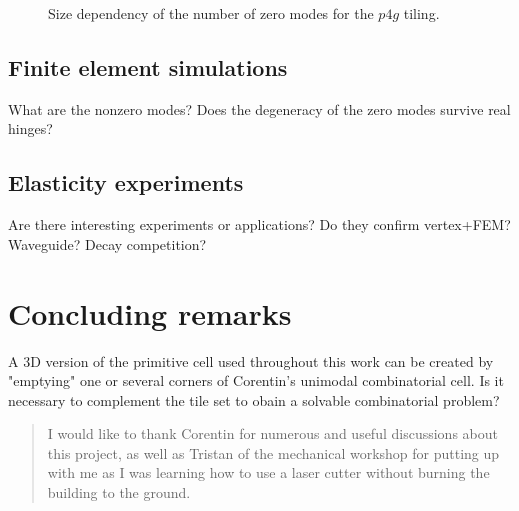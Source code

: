 	
		\begin{figure}[!ht]
				\caption{Size dependency of the number of zero modes for the $p4g$ tiling.}
				\label{fig:san:p4g}
			\end{figure}
			
		

\section{Finite element simulations}

	What are the nonzero modes? Does the degeneracy of the zero modes survive real hinges?

\section{Elasticity experiments}

	Are there interesting experiments or applications? Do they confirm vertex+FEM? Waveguide? Decay competition?
			
\chapter{Concluding remarks}

	A 3D version of the primitive cell used throughout this work can be created by "emptying" one or several corners of Corentin's unimodal combinatorial cell. Is it necessary to complement the tile set to obain a solvable combinatorial problem?
			
		
		
\renewcommand{\abstractname}{Acknowledgements}
\begin{abstract}
	I would like to thank Corentin for numerous and useful discussions about this project, as well as Tristan of the mechanical workshop for putting up with me as I was learning how to use a laser cutter without burning the building to the ground.
\end{abstract}

\newpage
{}


